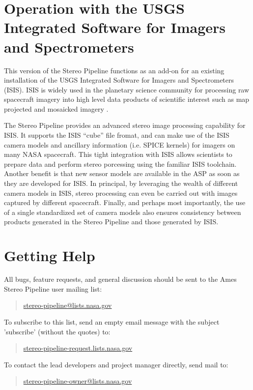 \section{Operation with the USGS Integrated Software for Imagers and Spectrometers}

This version of the Stereo Pipeline functions as an add-on for an
existing installation of the USGS Integrated Software for Imagers and
Spectrometers (ISIS).  ISIS is widely used in the planetary science
community for processing raw spacecraft imagery into high level data
products of scientific interest such as map projected and mosaicked
imagery \cite{2004LPI....35.2039A, 1997LPI....28..387G, ISIS_website}.

The Stereo Pipeline provides an advanced stereo image processing
capability for ISIS.  It supports the ISIS ``cube'' file fromat, and
can make use of the ISIS camera models and ancillary information
(i.e. SPICE kernels) for imagers on many NASA spacecraft.  This tight
integration with ISIS allows scientists to prepare data and perform
stereo porcessing using the familiar ISIS toolchain.  Another benefit
is that new sensor models are available in the ASP as soon as they are
developed for ISIS.  In principal, by leveraging the wealth of
different camera models in ISIS, stereo processing can even be carried
out with images captured by different spacecraft.  Finally, and
perhaps most importantly, the use of a single standardized set of
camera models also ensures consistency between products generated in
the Stereo Pipeline and those generated by ISIS.

\section{Getting Help}

All bugs, feature requests, and general discussion should be sent to
the Ames Stereo Pipeline user mailing list:
\begin{quote}
\indent \url{stereo-pipeline@lists.nasa.gov}
\end{quote}
To subscribe to this list, send an empty email message with the
subject 'subscribe' (without the quotes) to:
\begin{quote}
\indent \url{stereo-pipeline-request.lists.nasa.gov}
\end{quote}
To contact the lead developers and project manager directly, send mail
to:
\begin{quote}
\indent \url{stereo-pipeline-owner@lists.nasa.gov}
\end{quote}

